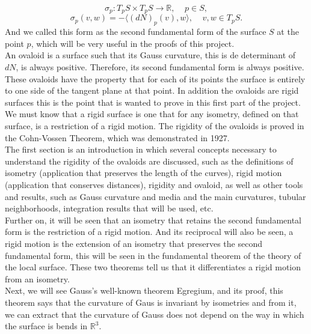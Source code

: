 $$ \sigma_p : T_pS \times T_pS \to \mathbb{R}, \;\;\;\; p \in S, $$
$$ \sigma_p(v,w) = - \langle (dN)_p(v), w \rangle, \;\;\;\; v,w \in T_pS. $$
And we called this form as the second fundamental form of the surface $S$ at the point $p$, which will be very useful in the proofs of this project.
${ }$\\

An ovaloid is a surface such that its Gauss curvature, this is de determinant of $dN$, is always positive. Therefore, its second fundamental form is always positive.
${ }$\\

These ovaloids have the property that for each of its points the surface is entirely to one side of the tangent plane at that point. In addition the ovaloids are rigid surfaces this is the point that is wanted to prove in this first part of the project. We must know that a rigid surface is one that for any isometry, defined on that surface, is a restriction of a rigid motion. The rigidity of the ovaloids is proved in the Cohn-Vossen Theorem, which was demonstrated in 1927.
${ }$\\

The first section is an introduction in which several concepts necessary to understand the rigidity of the ovaloids are discussed, such as the definitions of isometry (application that preserves the length of the curves), rigid motion (application that conserves distances), rigidity and ovaloid, as well as other tools and results, such as Gauss curvature and media and the main curvatures, tubular neighborhoods, integration results that will be used, etc.
${ }$\\

Further on, it will be seen that an isometry that retains the second fundamental form is the restriction of a rigid motion. And its reciprocal will also be seen, a rigid motion is the extension of an isometry that preserves the second fundamental form, this will be seen in the fundamental theorem of the theory of the local surface. These two theorems tell us that it differentiates a rigid motion from an isometry.
${ }$\\

Next, we will see Gauss's well-known theorem Egregium, and its proof, this theorem says that the curvature of Gaus is invariant by isometries and from it, we can extract that the curvature of Gauss does not depend on the way in which the surface is bends in $\mathbb{R}^3$.
${ }$\\

